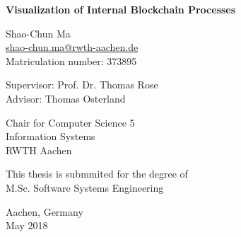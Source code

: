 \begin{titlepage}
    \begin{center}
        \vspace*{1cm}
        
        \huge
        \textbf{Visualization of Internal Blockchain Processes}
        
        \vspace{2cm}
        
        \large
        Shao-Chun Ma \\
        \href{mailto:shao-chun.ma@rwth-aachen.de}{shao-chun.ma@rwth-aachen.de} \\
        Matriculation number: 373895

        \vspace{1cm}

        Supervisor: Prof. Dr. Thomas Rose \\
        Advisor: Thomas Osterland \\

        \vspace{1.5cm}

        Chair for Computer Science 5 \\
        Information Systems \\
        RWTH Aachen
        
        \vfill
        
        This thesis is submmited for the degree of \\
        M.Sc. Software Systems Engineering
        
        \vspace{3cm}
        
        Aachen, Germany \\
        May 2018
        
    \end{center}
\end{titlepage}